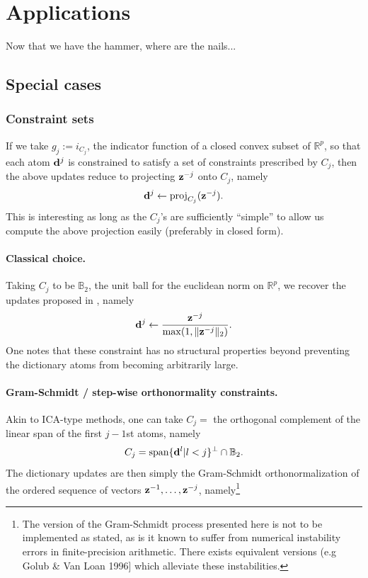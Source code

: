 \section{Applications}
Now that we have the hammer, where are the nails...
\subsection{Special cases}
\subsubsection{Constraint sets}
If we take $g_j := i_{C_j}$, the indicator function of a closed convex subset of $\mathbb R^p$, so that each atom $\mathbf{d}^j$ is constrained to satisfy a set of constraints prescribed by $C_j$, then the above updates reduce to projecting $\mathbf{z}^{-j}$ onto $C_j$, namely
\begin{equation}
\mathbf{d}^j \leftarrow  \text{proj}_{C_j}(\mathbf{z}^{-j}).
\end{equation}
This is interesting as long as the $C_j$'s are sufficiently ``simple'' to allow us compute the above projection easily (preferably in closed form).
\paragraph{Classical choice.}

Taking $C_j$ to be $\mathbb B_2$, the unit ball for the euclidean norm on  $\mathbb R^p$, we recover the updates proposed in \citep{mairal2009,mairal2010}, namely
\begin{equation}
\mathbf{d}^j \leftarrow  \frac{\mathbf{z}^{-j}}{\max(1,\|\mathbf{z}^{-j}\|_2)}.
\end{equation}
One notes that these constraint has no structural properties beyond preventing the dictionary atoms from becoming arbitrarily large.

\paragraph{Gram-Schmidt / step-wise orthonormality constraints.}
Akin to ICA-type methods, one can take $C_j =$ the orthogonal complement of the linear span of the first $j-1$st atoms, namely
  \begin{equation}
    C_{j} = \text{span}\{\mathbf{d}^l | l < j\}^\perp \cap \mathbb B_{2}.
  \end{equation}
  The dictionary updates are then simply the Gram-Schmidt orthonormalization of the ordered sequence of vectors $\mathbf{z}^{-1},\ldots,\mathbf{z}^{-j}$, namely\footnote{The version of the Gram-Schmidt process presented here is not to be implemented as stated, as is it known to suffer from numerical instability errors in finite-precision arithmetic. There exists equivalent versions (e.g Golub \& Van Loan 1996] which alleviate these instabilities.}

